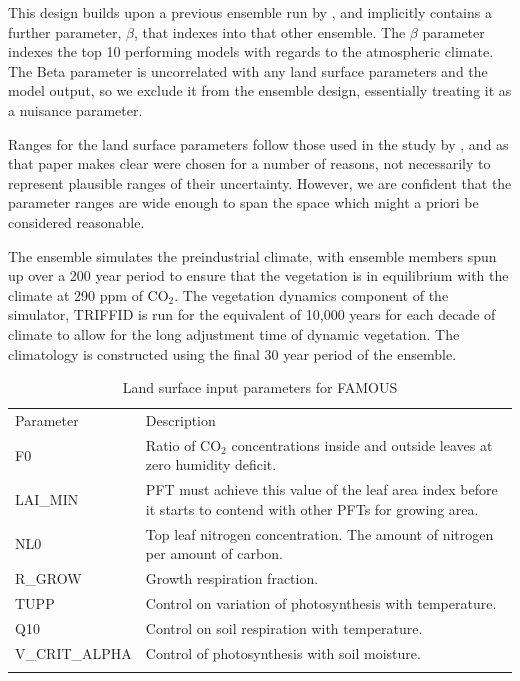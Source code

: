 \documentclass[esd, article]{copernicus} %
\begin{document}
This design builds upon a previous ensemble run by \cite{gregoire2010optimal}, and implicitly contains a further parameter, $\beta$, that indexes into that other ensemble. The $\beta$ parameter  indexes the top 10 performing models with regards to the atmospheric climate. The Beta parameter is uncorrelated with any land surface parameters and the model output, so we exclude it from the ensemble design, essentially treating it as a nuisance parameter.

Ranges for the land surface parameters follow those used in the study by \cite{booth2012highsensitivity}, and as that paper makes clear were chosen for a number of reasons, not necessarily to represent plausible ranges of their uncertainty. However, we are confident that the parameter ranges are wide enough to span the space which might a priori be considered reasonable.

The ensemble simulates the preindustrial climate, with ensemble members spun up over a 200 year period to ensure that the vegetation is in equilibrium with the climate at 290 ppm of CO$_{2}$. The vegetation dynamics component of the simulator, TRIFFID is run for the equivalent of 10,000 years for each decade of climate to allow for the long adjustment time of dynamic vegetation. The climatology is constructed using the final 30 year period of the ensemble. 


\begin{table}[t]
\caption{Land surface input parameters for FAMOUS}\label{tab:params}
\begin{tabular}{ll}

\tophline
Parameter &  Description \\
F0              &    Ratio of CO$_2$ concentrations inside and outside leaves at zero humidity deficit. \\
LAI\_MIN    &      PFT must achieve this value of the leaf area index before it starts to contend with other PFTs for growing area. \\
NL0           &      Top leaf nitrogen concentration. The amount of nitrogen per amount of carbon. \\
R\_GROW    &       Growth respiration fraction. \\
TUPP        &    Control on variation of photosynthesis with temperature. \\
Q10           &     Control on soil respiration with temperature. \\
V\_CRIT\_ALPHA  & Control of photosynthesis with soil moisture. \\
\bottomhline
\end{tabular}
\belowtable{} %
\end{table}
\end{document}
